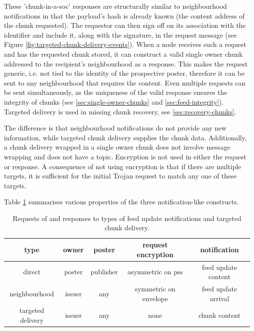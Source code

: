 These 'chunk-in-a-soc' responses are structurally similar to neighbourhood notifications in that the payload's hash is already known (the content address of the chunk requested). The requestor can then sign off on its association with the identifier and include it, along with the signature, in the request message (see Figure \ref{fig:targeted-chunk-delivery-events}). When a node receives such a request and has the requested chunk stored, it can construct a valid single owner chunk addressed to the recipient's neighbourhood as a response.
This makes the request generic, i.e. not tied to the identity of the prospective poster, therefore it can be sent to any neighbourhood that requires the content. Even multiple requests can be sent simultaneously, as the uniqueness of the valid response ensures the integrity of chunks (see \ref{sec:single-owner-chunks} and \ref{sec:feed-integrity}). Targeted delivery is used in missing chunk recovery, see \ref{sec:recovery-chunks}.

The difference is that neighbourhood notifications do not provide any new information, while targeted chunk delivery supplies the chunk data. Additionally, a chunk delivery wrapped in a single owner chunk does not involve message wrapping and does not have a topic. Encryption is not used in either the request or response.
A consequence of not using encryption is that if there are multiple targets, it is sufficient for the initial Trojan request to match any one of these targets. 

Table \ref{tab:notifications} summarises various properties of the three notification-like constructs.

\begin{table}[htpb]
    \centering
    \footnotesize
    \begin{tabular}{c|c|c|c|c|}
    type & owner & poster & request encryption & notification  \\\hline
         direct & poster & publisher & asymmetric on pss & feed update  content\\
         neighbourhood & issuer & any & symmetric on envelope & feed update arrival\\
         targeted delivery & issuer & any & none & chunk content\\
    \end{tabular}
    \caption[Feed update notifications]{Requests of and responses to types of feed update notifications and targeted chunk delivery.}
    \label{tab:notifications}
\end{table}

